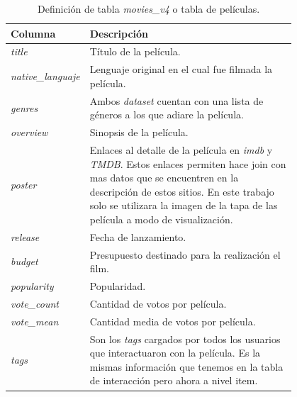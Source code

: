\documentclass[11pt,a4paper,twoside]{thesis}
\begin{document}
\begin{table}[!htb]
	\centering
	\footnotesize
	\begin{tabular}{l | p{0.8\linewidth}}
		\hline
		Columna                   & Descripción                                                                              \\
		\hline

		\textit{title}            & Título de la película.                                                                   \\
		\textit{native\_languaje} & Lenguaje original en el cual fue filmada la película.                                    \\
		\textit{genres}           & Ambos \textit{dataset} cuentan con una lista de géneros a los que adiare la película.    \\
		\textit{overview}         & Sinopsis de la película.                                                                 \\
		\textit{poster}           & Enlaces al detalle de la película en \textit{imdb} y \textit{TMDB}. Estos enlaces
		permiten hace join con mas datos que se encuentren en la descripción de estos
		sitios. En este trabajo solo se utilizara la imagen de la tapa de las película
		a modo de visualización.                                                                                             \\
		\textit{release}          & Fecha de lanzamiento.                                                                    \\
		\textit{budget}           & Presupuesto destinado para la realización el film.                                       \\
		\textit{popularity}       & Popularidad.                                                                             \\
		\textit{vote\_count}      & Cantidad de votos por película.                                                          \\
		\textit{vote\_mean}       & Cantidad media de votos por película.                                                    \\
		\textit{tags}             & Son los \textit{tags} cargados por todos los usuarios que interactuaron con la película.
		Es la mismas información que tenemos en la tabla de interacción pero ahora a nivel item.                             \\

		\hline
	\end{tabular}
	\caption{
		Definición de tabla \textit{movies\_v4} o tabla de películas.
	}
	\label{table:moviesTableDef}
\end{table}
\end{document}
